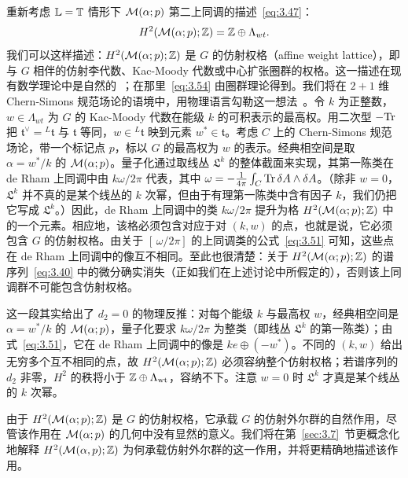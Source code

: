 重新考虑 $\mathbb{L}={\mathbb{T}}$ 情形下 ${\mathcal{M}}(\alpha;p)$ 第二上同调的描述~\eqref{eq:3.47}：
\setcounter{equation}{53}
\begin{equation}\label{eq:3.54}
  H^2({\mathcal{M}}(\alpha;p);{\mathbb{Z}})={\mathbb{Z}}\oplus
\Lambda_{wt}.
\end{equation}
我们可以这样描述：$H^2({\mathcal{M}}(\alpha;p);{\mathbb{Z}})$ 是 $G$ 的仿射权格（affine weight lattice），即与 $G$ 相伴的仿射李代数、Kac-Moody 代数或中心扩张圈群的权格。这一描述在现有数学理论中是自然的~\cite{ref54}；在那里~\eqref{eq:3.54} 由圈群理论得到。我们将在 $2+1$ 维 Chern-Simons 规范场论的语境中，用物理语言勾勒这一想法~\cite{ref59}。令 $k$ 为正整数，$w\in \Lambda_{wt}$ 为 $G$ 的 Kac-Moody 代数在能级 $k$ 的可积表示的最高权。用二次型 $-{\rm Tr}$ 把 $\mathfrak t^\vee={}^L\mathfrak t$ 与 $\mathfrak t$ 等同，$w\in {}^L\mathfrak t$ 映到元素 $w^*\in \mathfrak t$。考虑 $C$ 上的 Chern-Simons 规范场论，带一个标记点 $p$，标以 $G$ 的最高权为 $w$ 的表示。经典相空间是取 $\alpha=w^*/k$ 的 ${\mathcal{M}}(\alpha;p)$。量子化通过取线丛 $\mathfrak L^k$ 的整体截面来实现，其第一陈类在 de Rham 上同调中由 $k\omega/2\pi$ 代表，其中 $\omega=-{1\over 4\pi}\int_C{\rm Tr}\,\delta A\wedge \delta A$。（除非 $w=0$，$\mathfrak L^k$ 并不真的是某个线丛的 $k$ 次幂，但由于有理第一陈类中含有因子 $k$，我们仍把它写成 $\mathfrak L^k$。）因此，de Rham 上同调中的类 $k\omega/2\pi$ 提升为格 $H^2({\mathcal{M}}(\alpha;p);{\mathbb{Z}})$ 中的一个元素。相应地，该格必须包含对应于对 $(k,w)$ 的点，也就是说，它必须包含 $G$ 的仿射权格。由关于 $[\,\omega/2\pi]$ 的上同调类的公式~\eqref{eq:3.51} 可知，这些点在 de Rham 上同调中的像互不相同。至此也很清楚：关于 $H^2({\mathcal{M}}(\alpha;p);{\mathbb{Z}})$ 的谱序列~\eqref{eq:3.40} 中的微分确实消失（正如我们在上述讨论中所假定的），否则该上同调群不可能包含仿射权格。

\begin{yizhu}[物理图像补充]这一段其实给出了 $d_2=0$ 的物理反推：对每个能级 $k$ 与最高权 $w$，经典相空间是 $\alpha=w^*/k$ 的 ${\mathcal{M}}(\alpha;p)$，量子化要求 $k\omega/2\pi$ 为整类（即线丛 $\mathfrak L^k$ 的第一陈类）；由式~\eqref{eq:3.51}，它在 de Rham 上同调中的像是 $k e\oplus(-w^*)$。不同的 $(k,w)$ 给出无穷多个互不相同的点，故 $H^2({\mathcal{M}}(\alpha;p);{\mathbb{Z}})$ 必须容纳整个仿射权格；若谱序列的 $d_2$ 非零，$H^2$ 的秩将小于 ${\mathbb{Z}}\oplus\Lambda_{\rm wt}$，容纳不下。注意 $w=0$ 时 $\mathfrak L^k$ 才真是某个线丛的 $k$ 次幂。\end{yizhu}

由于 $H^2({\mathcal{M}}(\alpha;p);{\mathbb{Z}})$ 是 $G$ 的仿射权格，它承载 $G$ 的仿射外尔群的自然作用，尽管该作用在 ${\mathcal{M}}(\alpha;p)$ 的几何中没有显然的意义。我们将在第~\ref{sec:3.7}~节更概念化地解释 $H^2({\mathcal{M}}(\alpha,p);{\mathbb{Z}})$ 为何承载仿射外尔群的这一作用，并将更精确地描述该作用。


